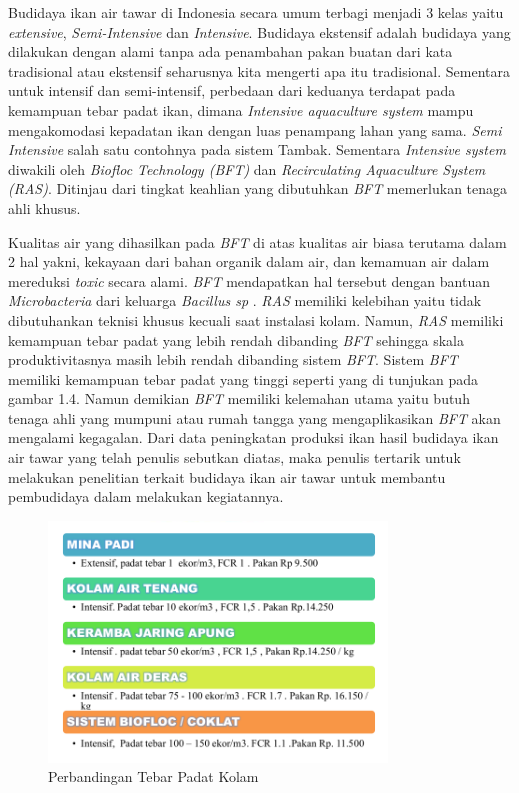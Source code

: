 Budidaya ikan air tawar di Indonesia secara umum terbagi menjadi 3 kelas yaitu \textit{extensive}, \textit{Semi-Intensive} dan \textit{Intensive}. Budidaya ekstensif adalah budidaya yang dilakukan dengan alami tanpa ada penambahan pakan buatan dari kata tradisional atau ekstensif seharusnya kita mengerti apa itu tradisional. Sementara untuk intensif dan semi-intensif, perbedaan dari keduanya terdapat pada kemampuan tebar padat ikan, dimana \textit{Intensive aquaculture system} mampu mengakomodasi kepadatan ikan dengan luas penampang lahan yang sama. \textit{Semi Intensive} salah satu contohnya pada sistem Tambak. Sementara \textit{Intensive system} diwakili oleh \textit{Biofloc Technology (BFT)} dan \textit{Recirculating Aquaculture System (RAS)}. Ditinjau dari tingkat keahlian yang dibutuhkan \textit{BFT} memerlukan tenaga ahli khusus. 

Kualitas air yang dihasilkan pada \textit{BFT} di atas kualitas air biasa terutama dalam 2 hal yakni, kekayaan dari bahan organik dalam air, dan kemamuan air dalam mereduksi \textit{toxic} secara alami. \textit{BFT} mendapatkan hal tersebut dengan bantuan \textit{Microbacteria} dari keluarga \textit{Bacillus sp} \citep{fattah2020}. \textit{RAS} memiliki kelebihan yaitu tidak dibutuhankan teknisi khusus kecuali saat instalasi kolam. Namun, \textit{RAS} memiliki kemampuan tebar padat yang lebih rendah dibanding \textit{BFT} sehingga skala produktivitasnya masih lebih rendah dibanding sistem \textit{BFT}. Sistem \textit{BFT} memiliki kemampuan tebar padat yang tinggi seperti yang di tunjukan pada gambar 1.4. Namun demikian \textit{BFT} memiliki kelemahan utama yaitu butuh tenaga ahli yang mumpuni atau rumah tangga yang mengaplikasikan \textit{BFT} akan mengalami kegagalan. Dari data peningkatan produksi ikan hasil budidaya ikan air tawar yang telah penulis sebutkan diatas, maka penulis tertarik untuk melakukan penelitian terkait budidaya ikan air tawar untuk membantu pembudidaya dalam melakukan kegiatannya.

\begin{figure}[H]
	\centering
	\includegraphics[keepaspectratio, width=9cm]{gambar/tebar_padat}
	\caption{Perbandingan Tebar Padat Kolam \citep{setiawan2021}}
	\label{gambar:tebar_padat}
\end{figure}

